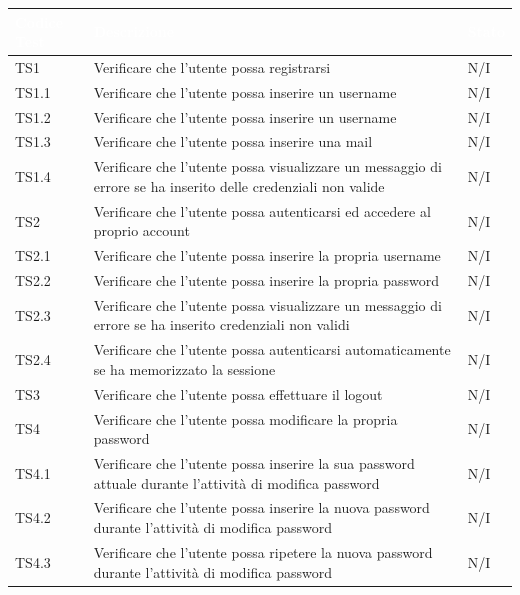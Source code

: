 {
    \setlength{\freewidth}{\dimexpr\textwidth-10\tabcolsep}
    \renewcommand{\arraystretch}{1.5}
    \centering
    \setlength{\aboverulesep}{0pt}
    \setlength{\belowrulesep}{0pt}
    \begin{longtable}{C{.3\freewidth} C{.5\freewidth} C{.3\freewidth}}
       \toprule
    \textcolor{white}{\textbf{Codice Test}}&
    \textcolor{white}{\textbf{Descrizione}}&
    \textcolor{white}{\textbf{Stato}}\\	
    \toprule
    \endhead

    TS1 & Verificare che l'utente possa registrarsi & N/I  \\ 
    TS1.1 & Verificare che l'utente possa inserire un username & N/I  \\
    TS1.2 & Verificare che l'utente possa inserire un username & N/I  \\
    TS1.3 & Verificare che l'utente possa inserire una mail & N/I  \\
    TS1.4 & Verificare che l'utente possa visualizzare un messaggio di errore se ha inserito delle credenziali non valide & N/I  \\
    TS2 & Verificare che l'utente possa autenticarsi ed accedere al proprio account & N/I  \\
    TS2.1 & Verificare che l'utente possa inserire la propria username & N/I  \\
    TS2.2 & Verificare che l'utente possa inserire la propria password & N/I  \\
    TS2.3 & Verificare che l'utente possa visualizzare un messaggio di errore se ha inserito credenziali non validi & N/I  \\
    TS2.4 & Verificare che l'utente possa autenticarsi automaticamente se ha memorizzato la sessione  & N/I  \\
    TS3 & Verificare che l'utente possa effettuare il logout & N/I  \\
    TS4 & Verificare che l'utente possa modificare la propria password & N/I  \\
    TS4.1 & Verificare che l'utente possa inserire la sua password attuale durante l'attività di modifica password & N/I  \\
    TS4.2 & Verificare che l'utente possa inserire la nuova password durante l'attività di modifica password & N/I  \\
    TS4.3 & Verificare che l'utente possa ripetere la nuova password durante l'attività di modifica password & N/I  \\

\end{longtable}}
